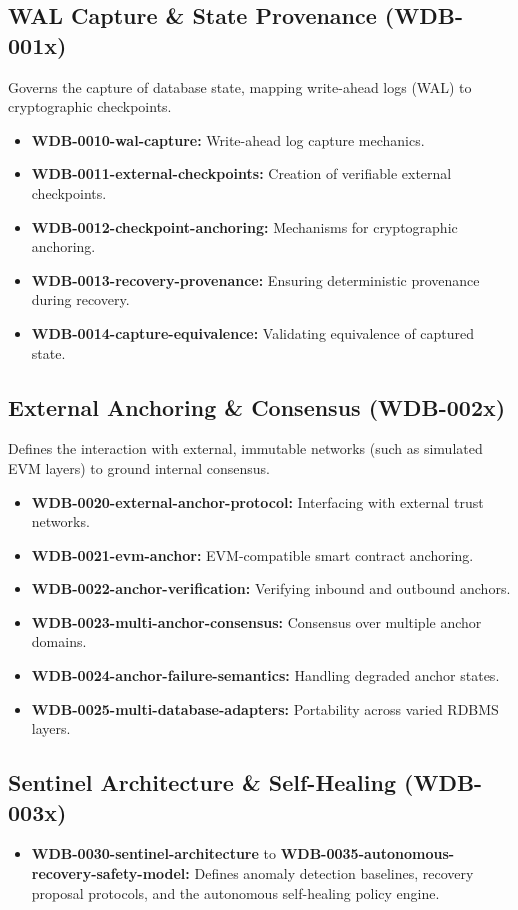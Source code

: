 \subsection{WAL Capture \& State Provenance (WDB-001x)}
Governs the capture of database state, mapping write-ahead logs (WAL) to cryptographic checkpoints.
\begin{itemize}
    \item \textbf{WDB-0010-wal-capture:} Write-ahead log capture mechanics.
    \item \textbf{WDB-0011-external-checkpoints:} Creation of verifiable external checkpoints.
    \item \textbf{WDB-0012-checkpoint-anchoring:} Mechanisms for cryptographic anchoring.
    \item \textbf{WDB-0013-recovery-provenance:} Ensuring deterministic provenance during recovery.
    \item \textbf{WDB-0014-capture-equivalence:} Validating equivalence of captured state.
\end{itemize}

\subsection{External Anchoring \& Consensus (WDB-002x)}
Defines the interaction with external, immutable networks (such as simulated EVM layers) to ground internal consensus.
\begin{itemize}
    \item \textbf{WDB-0020-external-anchor-protocol:} Interfacing with external trust networks.
    \item \textbf{WDB-0021-evm-anchor:} EVM-compatible smart contract anchoring.
    \item \textbf{WDB-0022-anchor-verification:} Verifying inbound and outbound anchors.
    \item \textbf{WDB-0023-multi-anchor-consensus:} Consensus over multiple anchor domains.
    \item \textbf{WDB-0024-anchor-failure-semantics:} Handling degraded anchor states.
    \item \textbf{WDB-0025-multi-database-adapters:} Portability across varied RDBMS layers.
\end{itemize}

\subsection{Sentinel Architecture \& Self-Healing (WDB-003x)}
\begin{itemize}
    \item \textbf{WDB-0030-sentinel-architecture} to \textbf{WDB-0035-autonomous-recovery-safety-model:} Defines anomaly detection baselines, recovery proposal protocols, and the autonomous self-healing policy engine.
\end{itemize}

